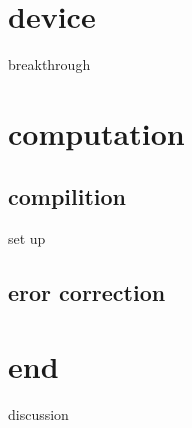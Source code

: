 \documentclass[18 pt]{beamer}
\begin{document}
\section{device}
\begin{frame}{breakthrough}
\end{frame}
\section{computation}
\subsection{compilition}
\begin{frame}{set up}
\end{frame}
\subsection{eror correction}
\section*{end}
\begin{frame}{discussion}
\end{frame}
\end{document}
